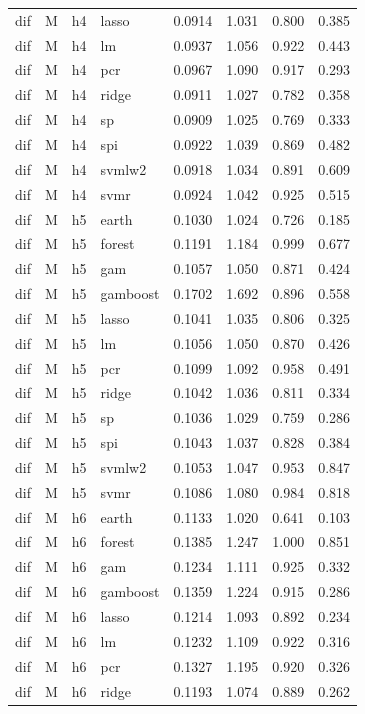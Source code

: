 \begin{ThreePartTable}
\begin{longtable}[t]{llclcccc}
dif & M & h4 & lasso & 0.0914 & 1.031 & 0.800 & 0.385\\
dif & M & h4 & lm & 0.0937 & 1.056 & 0.922 & 0.443\\
dif & M & h4 & pcr & 0.0967 & 1.090 & 0.917 & 0.293\\
dif & M & h4 & ridge & 0.0911 & 1.027 & 0.782 & 0.358\\
dif & M & h4 & sp & 0.0909 & 1.025 & 0.769 & 0.333\\
dif & M & h4 & spi & 0.0922 & 1.039 & 0.869 & 0.482\\
dif & M & h4 & svmlw2 & 0.0918 & 1.034 & 0.891 & 0.609\\
dif & M & h4 & svmr & 0.0924 & 1.042 & 0.925 & 0.515\\
\addlinespace
dif & M & h5 & earth & 0.1030 & 1.024 & 0.726 & 0.185\\
dif & M & h5 & forest & 0.1191 & 1.184 & 0.999 & 0.677\\
dif & M & h5 & gam & 0.1057 & 1.050 & 0.871 & 0.424\\
dif & M & h5 & gamboost & 0.1702 & 1.692 & 0.896 & 0.558\\
dif & M & h5 & lasso & 0.1041 & 1.035 & 0.806 & 0.325\\
dif & M & h5 & lm & 0.1056 & 1.050 & 0.870 & 0.426\\
dif & M & h5 & pcr & 0.1099 & 1.092 & 0.958 & 0.491\\
dif & M & h5 & ridge & 0.1042 & 1.036 & 0.811 & 0.334\\
dif & M & h5 & sp & 0.1036 & 1.029 & 0.759 & 0.286\\
dif & M & h5 & spi & 0.1043 & 1.037 & 0.828 & 0.384\\
dif & M & h5 & svmlw2 & 0.1053 & 1.047 & 0.953 & 0.847\\
dif & M & h5 & svmr & 0.1086 & 1.080 & 0.984 & 0.818\\
\addlinespace
dif & M & h6 & earth & 0.1133 & 1.020 & 0.641 & 0.103\\
dif & M & h6 & forest & 0.1385 & 1.247 & 1.000 & 0.851\\
dif & M & h6 & gam & 0.1234 & 1.111 & 0.925 & 0.332\\
dif & M & h6 & gamboost & 0.1359 & 1.224 & 0.915 & 0.286\\
dif & M & h6 & lasso & 0.1214 & 1.093 & 0.892 & 0.234\\
dif & M & h6 & lm & 0.1232 & 1.109 & 0.922 & 0.316\\
dif & M & h6 & pcr & 0.1327 & 1.195 & 0.920 & 0.326\\
dif & M & h6 & ridge & 0.1193 & 1.074 & 0.889 & 0.262\\

\end{longtable}
\end{ThreePartTable}
